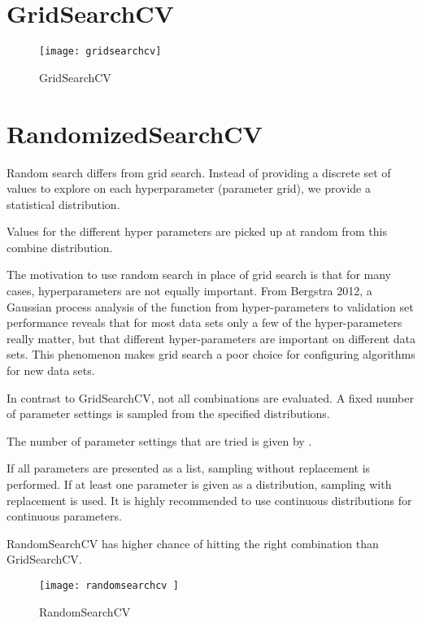 	\section{GridSearchCV}

	\begin{figure}[tbh]
		\centering
		\texttt{[image: gridsearchcv]}
		\caption{GridSearchCV}
		\label{fig:gridsearchcv}
	\end{figure}


	\section{\codefont RandomizedSearchCV}

	\begin{bulletedlist}
	\item Random search differs from grid search. Instead of providing a discrete set of values to explore on each hyperparameter (parameter grid), we provide a statistical distribution.
	\item Values for the different hyper parameters are picked up at random from this combine distribution.
	\item The motivation to use random search in place of grid search is that for many cases, hyperparameters are not equally important.  From Bergstra 2012, a Gaussian process analysis of the function from hyper-parameters to validation set performance reveals that for most data sets only a few of the hyper-parameters really matter, but that different hyper-parameters
are important on different data sets. This phenomenon makes grid search a poor choice for configuring algorithms for new data sets.
	\item In contrast to GridSearchCV, not all combinations are evaluated.  A fixed number of parameter settings is sampled from the specified distributions.
	\item The number of parameter settings that are tried is given by .
	\item If all parameters are presented as a list, sampling without replacement is performed. If at least one parameter is given as a distribution, sampling with replacement is used. It is highly recommended to use continuous distributions for continuous parameters.
	\item RandomSearchCV has higher chance of hitting the right combination than GridSearchCV.
	\end{bulletedlist}

	\begin{figure}[tbh]
		\centering
		\texttt{[image: randomsearchcv ]}
		\caption{RandomSearchCV}
		\label{fig:randomsearchcv }
	\end{figure}